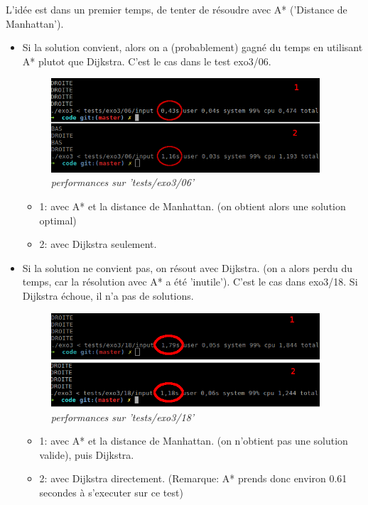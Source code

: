 \documentclass[10pt]{article}
\begin{document}
		L'idée est dans un premier temps, de tenter de résoudre avec A* ('Distance de Manhattan').			
		\begin{itemize}[label=-]
			\setlength\itemsep{0.1em}
			\item Si la solution convient, alors on a (probablement) gagné du temps en utilisant A*	
			plutot que Dijkstra. C'est le cas dans le test exo3/06.
			
			\begin{figure}[H]
				\begin{center}
					\includegraphics[width=10cm,height=\textheight,keepaspectratio]{./images/manhattan_performances.png}
				\end{center}
				\caption{\textit{performances sur 'tests/exo3/06'}}
			\end{figure}
			\begin{itemize}[label=-]
				\setlength\itemsep{0.1em}
				\item 1: avec A* et la distance de Manhattan. (on obtient alors une solution optimal)
				\item 2: avec Dijkstra seulement.
			\end{itemize}

			\item Si la solution ne convient pas, on résout avec Dijkstra. (on a alors perdu du temps,
			car la résolution avec A* a été 'inutile'). C'est le cas dans exo3/18. Si Dijkstra échoue, il n'a pas de solutions.
			
			\begin{figure}[H]
				\begin{center}
					\includegraphics[width=10cm,height=\textheight,keepaspectratio]{./images/manhattan_performances2.png}
				\end{center}
				\caption{\textit{performances sur 'tests/exo3/18'}}
			\end{figure}
			\begin{itemize}[label=-]
				\setlength\itemsep{0.1em}
				\item 1: avec A* et la distance de Manhattan. (on n'obtient pas une solution valide), puis Dijkstra.
				\item 2: avec Dijkstra directement. (Remarque: A* prends donc environ 0.61 secondes à s'executer sur ce test)
			\end{itemize}
			
		\end{itemize}
\end{document}
